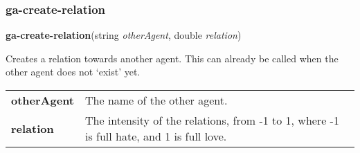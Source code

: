 \subsubsection{ga-create-relation}

\textbf{ga-create-relation}(string \emph{otherAgent}, double \emph{relation})\vspace{.5em}

\hspace{-\parindent}Creates a relation towards another agent. This can already be called when the other agent does not `exist' yet. \\[.4em]

\noindent
\begin{tabularx}{\textwidth}{@{}p{4cm} X}
	\textbf{otherAgent} & The name of the other agent.\\
	\textbf{relation} & The intensity of the relations, from -1 to 1, where -1 is full hate, and 1 is full love.\\
\end{tabularx}